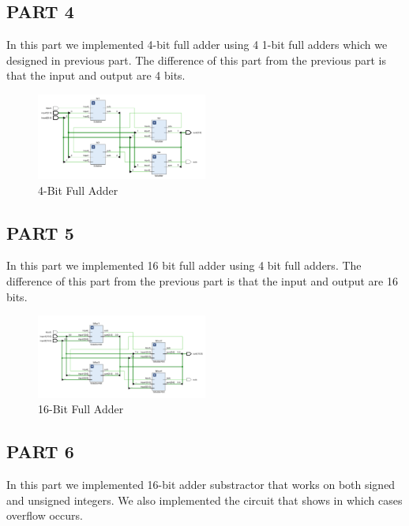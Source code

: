 \documentclass[pdftex,12pt,a4paper]{article}
\begin{document}
\subsection{PART 4}

In this part we implemented 4-bit full adder using 4 1-bit full adders which we designed in previous part. The difference of this part from the previous part is that the input and output are 4 bits.


\begin{figure}[H]
    \centering
    \includegraphics[width=0.5\textwidth]{fulladder4bit_vivado.png}
    \caption{4-Bit Full Adder}
   
\end{figure}

\subsection{PART 5}

In this part we implemented 16 bit full adder using 4 bit full adders. The difference of this part from the previous part is that the input and output are 16 bits.

\begin{figure}[H]
    \centering
    \includegraphics[width=0.5\textwidth]{fulladder16bit_vivado.png}
    \caption{16-Bit Full Adder}
\end{figure}

\subsection{PART 6}

In this part we implemented 16-bit adder substractor that works on both signed and unsigned integers. We also implemented the circuit that shows in which cases overflow occurs.
\end{document}
